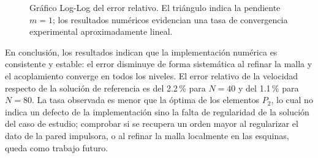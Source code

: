 \documentclass[12pt, letterpaper]{report}
\theoremstyle{definition}
\begin{document}
\begin{figure}[H]
\centering
{}
\caption{Gráfico Log-Log del error relativo. El triángulo indica la pendiente $m=1$; los resultados numéricos evidencian una tasa de convergencia experimental aproximadamente lineal.}
\label{fig:loglog}
\end{figure}

En conclusión, los resultados indican que la implementación numérica es consistente y estable: el error disminuye de forma sistemática al refinar la malla y el acoplamiento converge en todos los niveles. El error relativo de la velocidad respecto de la solución de referencia es del 2.2\,\% para $N = 40$ y del 1.1\,\% para $N = 80$. La tasa observada es menor que la óptima de los elementos $P_2$, lo cual no indica un defecto de la implementación sino la falta de regularidad de la solución del caso de estudio; comprobar si se recupera un orden mayor al regularizar el dato de la pared impulsora, o al refinar la malla localmente en las esquinas, queda como trabajo futuro.
\end{document}
